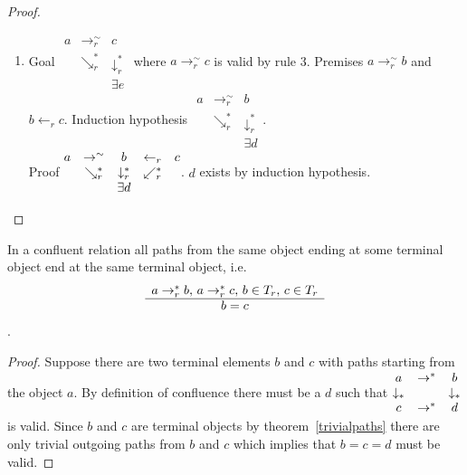 \begin{theorem}
\begin{proof}
\begin{enumerate}
    \item
      Goal
      $\begin{matrix}
        a    & \to_r^\sim      & c                      \\
              & \searrow_r^* & \downarrow_r^*  \\
        & & \exists e
      \end{matrix}$
      where $a \to_r^\sim c$ is valid by rule 3. Premises $a \to_r^\sim b$
      and $b \gets_r c$.
      Induction hypothesis
      $\begin{matrix}
        a    & \to_r^\sim      & b                      \\
              & \searrow_r^* & \downarrow_r^*  \\
        & & \exists d
      \end{matrix}$.\\
      Proof
      $\begin{matrix}
        a              & \to^\sim       & b            & \gets_r & c \\
        & \searrow_r^* & \downarrow_r^* & \swarrow_r^* \\
        &              & \exists d
      \end{matrix}$.
      $d$ exists by induction hypothesis.
    \end{enumerate}
  \end{proof}
\end{theorem}


\begin{theorem}
  In a confluent relation all paths from the same object ending at some terminal
  object end at the same terminal object, i.e.
  $$\begin{array}{c} a \to_r^* b, \, a \to_r^* c, \, b \in T_r, \, c \in T_r \\ \hline b = c\end{array}$$.

  \begin{proof}
    Suppose there are two terminal elements $b$ and $c$ with paths starting
    from the object $a$.
    By definition of confluence there must be a $d$ such that
    $\begin{matrix} a & \to^* & b \\
      \downarrow_* & & \downarrow_* \\
      c & \to^* & d
    \end{matrix}$ is valid. Since $b$ and $c$ are terminal objects by
    theorem~\ref{trivialpaths} there are only trivial outgoing paths from $b$
    and $c$ which implies that $b = c = d$ must be valid.
  \end{proof}
\end{theorem}


